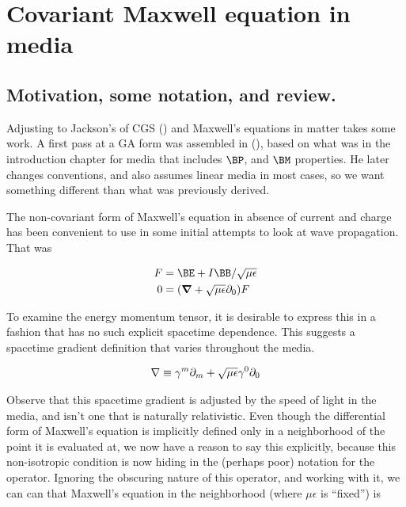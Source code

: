 

\chapter{Covariant Maxwell equation in media}
\label{chap:covariantMedia}
{}
\date{Aug 10, 2009}

\beginArtWithToc

\section{Motivation, some notation, and review.}

Adjusting to Jackson's of CGS (\cite{jackson1975cew}) and Maxwell's equations in matter takes some work.  A first pass at a GA form was assembled in (\cite{macroscopicMaxwell}), based on what was in the introduction chapter for media that includes $\BP$, and $\BM$ properties.  He later changes conventions, and also assumes linear media in most cases, so we want something different than what was previously derived.

The non-covariant form of Maxwell's equation in absence of current and charge has been convenient to use in some initial attempts to look at wave propagation.  That was

\begin{align}\label{eqn:foo1}
F &= \BE + I\BB/\sqrt{\mu\epsilon} \\
0 &= (\spacegrad + \sqrt{\mu\epsilon} \partial_0) F
\end{align}

To examine the energy momentum tensor, it is desirable to express this in a fashion that has no such explicit spacetime dependence.  This suggests a spacetime gradient definition that varies throughout the media.

\begin{align}\label{eqn:foo2}
\nabla \equiv \gamma^m \partial_m + \sqrt{\mu\epsilon} \gamma^0 \partial_0
\end{align}

Observe that this spacetime gradient is adjusted by the speed of light in the media, and isn't one that is naturally relativistic.  Even though the differential form of Maxwell's equation is implicitly defined only in a neighborhood of the point it is evaluated at, we now have a reason to say this explicitly, because this non-isotropic condition is now hiding in the (perhaps poor) notation for the operator.  Ignoring the obscuring nature of this operator, and working with it, we can can that Maxwell's equation in the neighborhood (where $\mu\epsilon$ is ``fixed'') is

